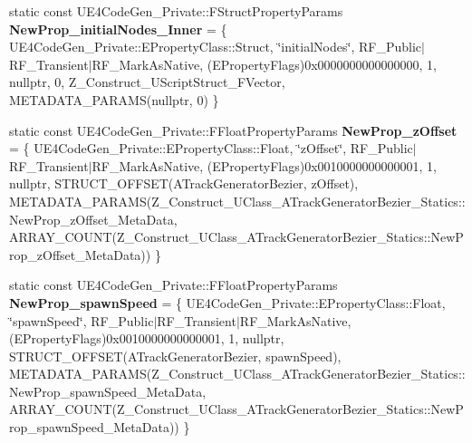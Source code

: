 \begin{DoxyCompactItemize}
static const U\+E4\+Code\+Gen\+\_\+\+Private\+::\+F\+Struct\+Property\+Params {\bfseries New\+Prop\+\_\+initial\+Nodes\+\_\+\+Inner} = \{ U\+E4\+Code\+Gen\+\_\+\+Private\+::\+E\+Property\+Class\+::\+Struct, \char`\"{}initial\+Nodes\char`\"{}, R\+F\+\_\+\+Public$\vert$R\+F\+\_\+\+Transient$\vert$R\+F\+\_\+\+Mark\+As\+Native, (E\+Property\+Flags)0x0000000000000000, 1, nullptr, 0, Z\+\_\+\+Construct\+\_\+\+U\+Script\+Struct\+\_\+\+F\+Vector, M\+E\+T\+A\+D\+A\+T\+A\+\_\+\+P\+A\+R\+A\+M\+S(nullptr, 0) \}
\item 
\mbox{\label{struct_z___construct___u_class___a_track_generator_bezier___statics_a5a61d5fa50e01259d62ac5c03d2df0b5}} 
static const U\+E4\+Code\+Gen\+\_\+\+Private\+::\+F\+Float\+Property\+Params {\bfseries New\+Prop\+\_\+z\+Offset} = \{ U\+E4\+Code\+Gen\+\_\+\+Private\+::\+E\+Property\+Class\+::\+Float, \char`\"{}z\+Offset\char`\"{}, R\+F\+\_\+\+Public$\vert$R\+F\+\_\+\+Transient$\vert$R\+F\+\_\+\+Mark\+As\+Native, (E\+Property\+Flags)0x0010000000000001, 1, nullptr, S\+T\+R\+U\+C\+T\+\_\+\+O\+F\+F\+S\+E\+T(\+A\+Track\+Generator\+Bezier, z\+Offset), M\+E\+T\+A\+D\+A\+T\+A\+\_\+\+P\+A\+R\+A\+M\+S(\+Z\+\_\+\+Construct\+\_\+\+U\+Class\+\_\+\+A\+Track\+Generator\+Bezier\+\_\+\+Statics\+::\+New\+Prop\+\_\+z\+Offset\+\_\+\+Meta\+Data, A\+R\+R\+A\+Y\+\_\+\+C\+O\+U\+N\+T(\+Z\+\_\+\+Construct\+\_\+\+U\+Class\+\_\+\+A\+Track\+Generator\+Bezier\+\_\+\+Statics\+::\+New\+Prop\+\_\+z\+Offset\+\_\+\+Meta\+Data)) \}
\item 
\mbox{\label{struct_z___construct___u_class___a_track_generator_bezier___statics_a3ac12a95e0618e14b5982fb602f9d831}} 
static const U\+E4\+Code\+Gen\+\_\+\+Private\+::\+F\+Float\+Property\+Params {\bfseries New\+Prop\+\_\+spawn\+Speed} = \{ U\+E4\+Code\+Gen\+\_\+\+Private\+::\+E\+Property\+Class\+::\+Float, \char`\"{}spawn\+Speed\char`\"{}, R\+F\+\_\+\+Public$\vert$R\+F\+\_\+\+Transient$\vert$R\+F\+\_\+\+Mark\+As\+Native, (E\+Property\+Flags)0x0010000000000001, 1, nullptr, S\+T\+R\+U\+C\+T\+\_\+\+O\+F\+F\+S\+E\+T(\+A\+Track\+Generator\+Bezier, spawn\+Speed), M\+E\+T\+A\+D\+A\+T\+A\+\_\+\+P\+A\+R\+A\+M\+S(\+Z\+\_\+\+Construct\+\_\+\+U\+Class\+\_\+\+A\+Track\+Generator\+Bezier\+\_\+\+Statics\+::\+New\+Prop\+\_\+spawn\+Speed\+\_\+\+Meta\+Data, A\+R\+R\+A\+Y\+\_\+\+C\+O\+U\+N\+T(\+Z\+\_\+\+Construct\+\_\+\+U\+Class\+\_\+\+A\+Track\+Generator\+Bezier\+\_\+\+Statics\+::\+New\+Prop\+\_\+spawn\+Speed\+\_\+\+Meta\+Data)) \}

\end{DoxyCompactItemize}

